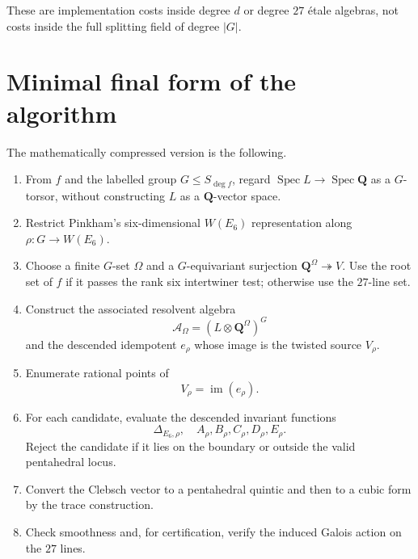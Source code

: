 \documentclass[11pt]{article}
\newcommand{\QQ}{\mathbf{Q}}
\newcommand{\Spec}{\operatorname{Spec}}
\newcommand{\im}{\operatorname{im}}
\newcommand{\cA}{\mathcal{A}}
\begin{document}
These are implementation costs inside degree $d$ or degree $27$ \'etale algebras,
not costs inside the full splitting field of degree $|G|$.

\section{Minimal final form of the algorithm}

The mathematically compressed version is the following.

\begin{enumerate}[label=\textbf{A\arabic*.}]
\item From $f$ and the labelled group $G\leq S_{\deg f}$, regard
$\Spec L\to\Spec\QQ$ as a $G$-torsor, without constructing $L$ as a
$\QQ$-vector space.

\item Restrict Pinkham's six-dimensional $W(E_6)$ representation along
$\rho:G\to W(E_6)$.

\item Choose a finite $G$-set $\Omega$ and a $G$-equivariant surjection
$\QQ^\Omega\twoheadrightarrow V$.  Use the root set of $f$ if it passes the rank
six intertwiner test; otherwise use the $27$-line set.

\item Construct the associated resolvent algebra
\[
  \cA_\Omega=(L\otimes\QQ^\Omega)^G
\]
and the descended idempotent $e_\rho$ whose image is the twisted source
$V_\rho$.

\item Enumerate rational points of
\[
  V_\rho=\im(e_\rho).
\]

\item For each candidate, evaluate the descended invariant functions
\[
  \Delta_{E_6,\rho},\quad
  A_\rho,B_\rho,C_\rho,D_\rho,E_\rho.
\]
Reject the candidate if it lies on the boundary or outside the valid pentahedral
locus.

\item Convert the Clebsch vector to a pentahedral quintic and then to a cubic form
by the trace construction.

\item Check smoothness and, for certification, verify the induced Galois action on
the $27$ lines.
\end{enumerate}
\end{document}
